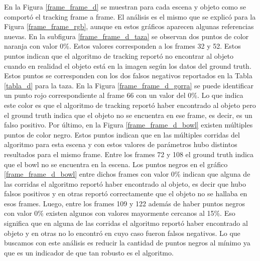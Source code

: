 En la Figura \ref{frame_frame_d} se muestran para cada escena y objeto como se comportó el tracking frame a frame. El análisis es el mismo que se explicó para la Figura \ref{frame_frame_rgb}, aunque en estos gráficos aparecen algunas referencias nuevas. En la subfigura \ref{frame_frame_d_taza} se observan dos puntos de color naranja con valor 0\%. Estos valores corresponden a los frames 32 y 52. Estos puntos indican que el algoritmo de tracking reportó no encontrar al objeto cuando en realidad el objeto está en la imagen según los datos del ground truth. Estos puntos se corresponden con los dos falsos negativos reportados en la Tabla \ref{tabla_d} para la taza. En la Figura \ref{frame_frame_d_gorra} se puede identificar un punto rojo correspondiente al frame 66 con un valor del 0\%. Lo que indica este color es que el algoritmo de tracking reportó haber encontrado al objeto pero el ground truth indica que el objeto no se encuentra en ese frame, es decir, es un falso positivo. Por último, en la Figura \ref{frame_frame_d_bowl} existen múltiples puntos de color negro. Estos puntos indican que en las múltiples corridas del algoritmo para esta escena y con estos valores de parámetros hubo distintos resultados para el mismo frame.  Entre los frames 72 y 108 el ground truth indica que el bowl no se encuentra en la escena. Los puntos negros en el gráfico \ref{frame_frame_d_bowl} entre dichos frames con valor 0\% indican que alguna de las corridas el algoritmo reportó haber encontrado al objeto, es decir que hubo falsos positivos y en otras reportó correctamente que el objeto no se hallaba en esos frames. Luego, entre los frames 109 y 122 además de haber puntos negros con valor 0\% existen algunos con valores mayormente cercanos al 15\%. Eso significa que en alguna de las corridas el algoritmo reportó haber encontrado al objeto y en otras no lo encontró en cuyo caso fueron falsos negativos. Lo que buscamos con este análisis es reducir la cantidad de puntos negros al mínimo ya que es un indicador de que tan robusto es el algoritmo.

